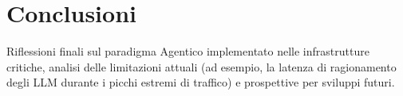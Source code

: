 
\chapter{Conclusioni}
\label{cap:conclusioni}

Riflessioni finali sul paradigma Agentico implementato nelle infrastrutture critiche, analisi delle limitazioni attuali (ad esempio, la latenza di ragionamento degli LLM durante i picchi estremi di traffico) e prospettive per sviluppi futuri.
